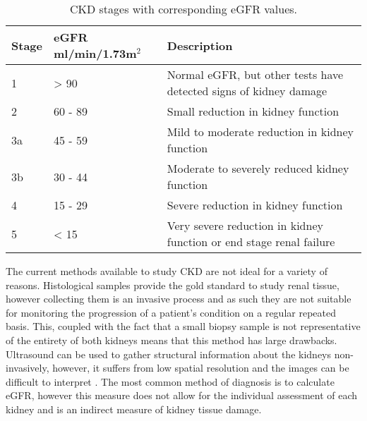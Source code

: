 \begin{table}[H]
	\centering
	\begin{tabularx}{1.0\textwidth}{|l|l|X|}
		\hline
		Stage & eGFR ml/min/1.73m$^2$ & Description                                                         \\ \hline
		1     & >  90                 & Normal eGFR, but other tests have detected signs of kidney damage   \\ \hline
		2     & 60 - 89               & Small reduction in kidney function                                  \\ \hline
		3a    & 45 - 59               & Mild to moderate reduction in kidney function                       \\ \hline
		3b    & 30 - 44               & Moderate to severely reduced kidney function                        \\ \hline
		4     & 15 - 29               & Severe reduction in kidney function                                 \\ \hline
		5     & < 15                  & Very severe reduction in kidney function or end stage renal failure \\ \hline
	\end{tabularx}
	\caption{\ac{CKD} stages with corresponding \ac{eGFR} values.}
	\label{tab:intro_ckd_stages}
\end{table}

The current methods available to study \ac{CKD} are not ideal for a variety of reasons. Histological samples provide the gold standard to study renal tissue, however collecting them is an invasive process and as such they are not suitable for monitoring the progression of a patient's condition on a regular repeated basis. This, coupled with the fact that a small biopsy sample is not representative of the entirety of both kidneys means that this method  has large drawbacks. Ultrasound can be used to gather structural information about the kidneys non-invasively, however, it suffers from low spatial resolution and the images can be difficult to interpret \cite{hansen_ultrasonography_2015}. The most common method of diagnosis is to calculate \ac{eGFR}, however this measure does not allow for the individual assessment of each kidney and is an indirect measure of kidney tissue damage.

